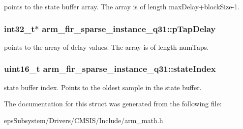 points to the state buffer array. The array is of length max\-Delay+block\-Size-\/1. \hypertarget{structarm__fir__sparse__instance__q31_ab87ae457adec8f727afefaa2599fc983}{
\subsubsection[{p\-Tap\-Delay}]{\setlength{\rightskip}{0pt plus 5cm}int32\-\_\-t$\ast$ arm\-\_\-fir\-\_\-sparse\-\_\-instance\-\_\-q31\-::p\-Tap\-Delay}}\label{structarm__fir__sparse__instance__q31_ab87ae457adec8f727afefaa2599fc983}
points to the array of delay values. The array is of length num\-Taps. \hypertarget{structarm__fir__sparse__instance__q31_a557ed9d477e76e4ad2019344f19f568a}{
\subsubsection[{state\-Index}]{\setlength{\rightskip}{0pt plus 5cm}uint16\-\_\-t arm\-\_\-fir\-\_\-sparse\-\_\-instance\-\_\-q31\-::state\-Index}}\label{structarm__fir__sparse__instance__q31_a557ed9d477e76e4ad2019344f19f568a}
state buffer index. Points to the oldest sample in the state buffer. 

The documentation for this struct was generated from the following file\-:\begin{DoxyCompactItemize}
\item 
eps\-Subsystem/\-Drivers/\-C\-M\-S\-I\-S/\-Include/arm\-\_\-math.\-h\end{DoxyCompactItemize}

